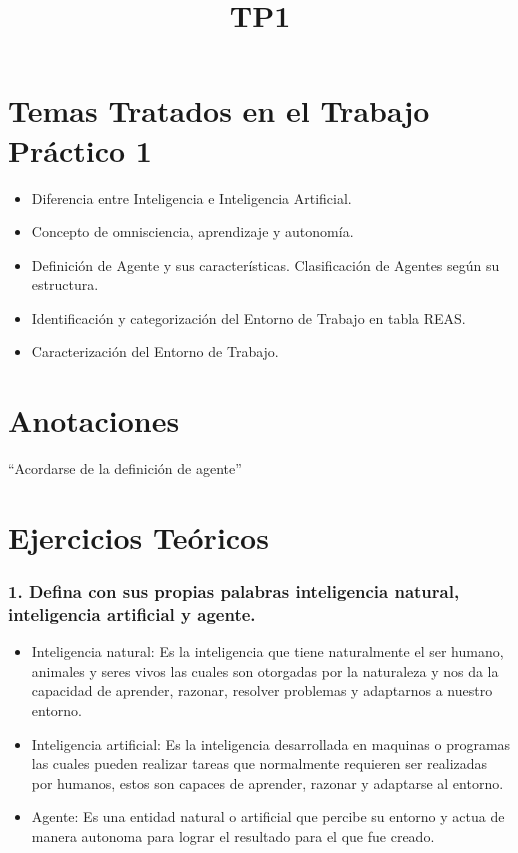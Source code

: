 \documentclass[11pt]{article}
\title{TP1}
\begin{document}
    
    \maketitle
    
    

    
    \section*{Temas Tratados en el Trabajo Práctico
1}\label{temas-tratados-en-el-trabajo-pruxe1ctico-1}

\begin{itemize}
\item
  Diferencia entre Inteligencia e Inteligencia Artificial.
\item
  Concepto de omnisciencia, aprendizaje y autonomía.
\item
  Definición de Agente y sus características. Clasificación de Agentes
  según su estructura.
\item
  Identificación y categorización del Entorno de Trabajo en tabla REAS.
\item
  Caracterización del Entorno de Trabajo.
\end{itemize}

\section{Anotaciones}\label{anotaciones}

``Acordarse de la definición de agente''

    \section{Ejercicios Teóricos}\label{ejercicios-teuxf3ricos}

\subsubsection{1. Defina con sus propias palabras inteligencia natural,
inteligencia artificial y
agente.}\label{defina-con-sus-propias-palabras-inteligencia-natural-inteligencia-artificial-y-agente.}

    \begin{itemize}
\item
  Inteligencia natural: Es la inteligencia que tiene naturalmente el ser
  humano, animales y seres vivos las cuales son otorgadas por la
  naturaleza y nos da la capacidad de aprender, razonar, resolver
  problemas y adaptarnos a nuestro entorno.
\item
  Inteligencia artificial: Es la inteligencia desarrollada en maquinas o
  programas las cuales pueden realizar tareas que normalmente requieren
  ser realizadas por humanos, estos son capaces de aprender, razonar y
  adaptarse al entorno.
\item
  Agente: Es una entidad natural o artificial que percibe su entorno y
  actua de manera autonoma para lograr el resultado para el que fue
  creado.
\end{itemize}
\end{document}
